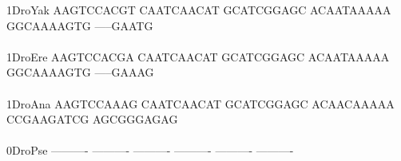 \documentclass[11pt,twoside,reqno,a4paper]{article}
\begin{document}
{1\hspace*{4\charwidth}DroYak	AAGTCCACGT	CAATCAACAT	GCATCGGAGC	ACAATAAAAA	GGCAAAAGTG	-----GAATG	\\
\hspace*{5\charwidth}\hspace*{7\charwidth}\hspace*{1\charwidth}\hspace*{1\charwidth}\hspace*{1\charwidth}\hspace*{1\charwidth}\hspace*{1\charwidth}\hspace*{1\charwidth}\\
1\hspace*{4\charwidth}DroEre	AAGTCCACGA	CAATCAACAT	GCATCGGAGC	ACAATAAAAA	GGCAAAAGTG	-----GAAAG	\\
\hspace*{5\charwidth}\hspace*{7\charwidth}\hspace*{1\charwidth}\hspace*{1\charwidth}\hspace*{1\charwidth}\hspace*{1\charwidth}\hspace*{1\charwidth}\hspace*{1\charwidth}\\
1\hspace*{4\charwidth}DroAna	AAGTCCAAAG	CAATCAACAT	GCATCGGAGC	ACAACAAAAA	CCGAAGATCG	AGCGGGAGAG	\\
\hspace*{5\charwidth}\hspace*{7\charwidth}\hspace*{1\charwidth}\hspace*{1\charwidth}\hspace*{1\charwidth}\hspace*{1\charwidth}\hspace*{1\charwidth}\hspace*{1\charwidth}\\
0\hspace*{4\charwidth}DroPse	----------	----------	----------	----------	----------	----------	\\
\hspace*{5\charwidth}\hspace*{7\charwidth}\hspace*{1\charwidth}\hspace*{1\charwidth}\hspace*{1\charwidth}\hspace*{1\charwidth}\hspace*{1\charwidth}\hspace*{1\charwidth}\\
}
\end{document}
